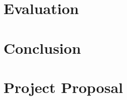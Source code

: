 \documentclass[12pt,a4paper,twoside,openright]{report}
\begin{document}
	\chapter{Evaluation}
	
	\chapter{Conclusion}
	
	
	
	
	
	\appendix

	\chapter{Project Proposal}
	
	
	
	
\end{document}
